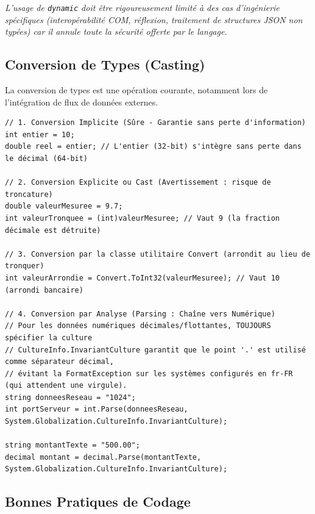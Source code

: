 \textit{L'usage de \texttt{dynamic} doit être rigoureusement limité à des cas d'ingénierie spécifiques (interopérabilité COM, réflexion, traitement de structures JSON non typées) car il annule toute la sécurité offerte par le langage.}

\subsection{Conversion de Types (Casting)}

La conversion de types est une opération courante, notamment lors de l'intégration de flux de données externes.

\begin{lstlisting}[caption={Mécanismes de conversion en C\#}]
// 1. Conversion Implicite (Sûre - Garantie sans perte d'information)
int entier = 10;
double reel = entier; // L'entier (32-bit) s'intègre sans perte dans le décimal (64-bit)

// 2. Conversion Explicite ou Cast (Avertissement : risque de troncature)
double valeurMesuree = 9.7;
int valeurTronquee = (int)valeurMesuree; // Vaut 9 (la fraction décimale est détruite)

// 3. Conversion par la classe utilitaire Convert (arrondit au lieu de tronquer)
int valeurArrondie = Convert.ToInt32(valeurMesuree); // Vaut 10 (arrondi bancaire)

// 4. Conversion par Analyse (Parsing : Chaîne vers Numérique)
// Pour les données numériques décimales/flottantes, TOUJOURS spécifier la culture
// CultureInfo.InvariantCulture garantit que le point '.' est utilisé comme séparateur décimal,
// évitant la FormatException sur les systèmes configurés en fr-FR (qui attendent une virgule).
string donneesReseau = "1024";
int portServeur = int.Parse(donneesReseau, System.Globalization.CultureInfo.InvariantCulture); 

string montantTexte = "500.00";
decimal montant = decimal.Parse(montantTexte, System.Globalization.CultureInfo.InvariantCulture);
\end{lstlisting}

\subsection{Bonnes Pratiques de Codage}

